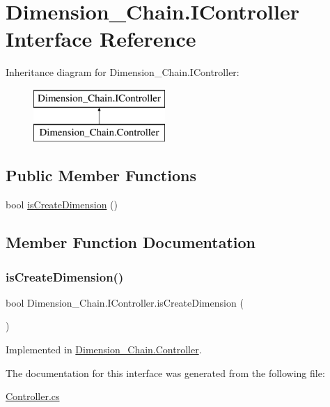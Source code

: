 \hypertarget{interface_dimension___chain_1_1_i_controller}{}\section{Dimension\+\_\+\+Chain.\+I\+Controller Interface Reference}
\label{interface_dimension___chain_1_1_i_controller}
Inheritance diagram for Dimension\+\_\+\+Chain.\+I\+Controller\+:\begin{figure}[H]
\begin{center}
\leavevmode
\includegraphics[height=2.000000cm]{interface_dimension___chain_1_1_i_controller}
\end{center}
\end{figure}
\subsection*{Public Member Functions}
\begin{DoxyCompactItemize}
\item 
bool \mbox{\hyperlink{interface_dimension___chain_1_1_i_controller_a228ee16ef616fee00fc5141e3ebef9db}{is\+Create\+Dimension}} ()
\end{DoxyCompactItemize}


\subsection{Member Function Documentation}
\mbox{\label{interface_dimension___chain_1_1_i_controller_a228ee16ef616fee00fc5141e3ebef9db}} 
\subsubsection{\texorpdfstring{is\+Create\+Dimension()}{isCreateDimension()}}
{\footnotesize\ttfamily bool Dimension\+\_\+\+Chain.\+I\+Controller.\+is\+Create\+Dimension (\begin{DoxyParamCaption}{ }\end{DoxyParamCaption})}



Implemented in \mbox{\hyperlink{class_dimension___chain_1_1_controller_ae8c6a98ffe1507c958ca65e93d533c87}{Dimension\+\_\+\+Chain.\+Controller}}.



The documentation for this interface was generated from the following file\+:\begin{DoxyCompactItemize}
\item 
\mbox{\hyperlink{_controller_8cs}{Controller.\+cs}}\end{DoxyCompactItemize}
